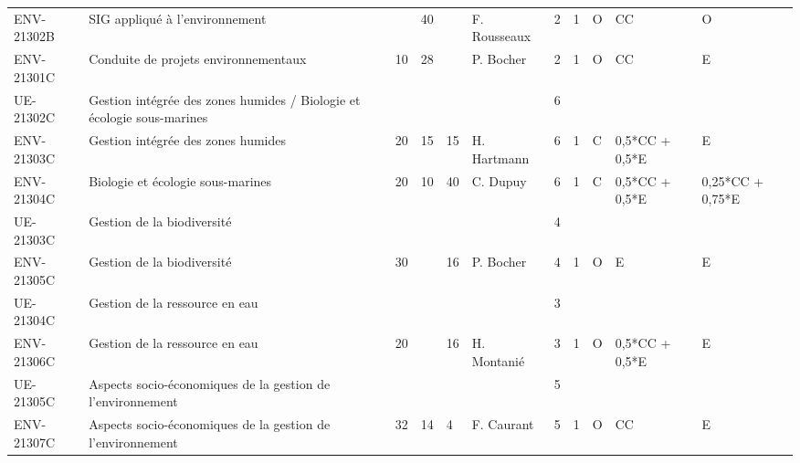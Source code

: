 \documentclass[a4paper,11pt]{article}
\begin{document}
{{\begin{tabular}{lllllllllll}
ENV-21302B    & SIG appliqué à l'environnement                                                 &    & 40 &    & F. Rousseaux    & 2    & 1    & O           & CC               & O                \\
ENV-21301C    & Conduite de projets environnementaux                                           & 10 & 28 &    & P. Bocher       & 2    & 1    & O           & CC               & E                \\
\rowcolor[HTML]{C0C0C0} 
UE-21302C     & Gestion intégrée des zones humides / Biologie et écologie sous-marines         &    &    &    &                 & 6    &      &             &                  &                  \\
ENV-21303C    & Gestion intégrée des zones humides                                             & 20 & 15 & 15 & H. Hartmann     & 6    & 1    & C           & 0,5*CC + 0,5*E   & E                \\
ENV-21304C    & Biologie et écologie sous-marines                                              & 20 & 10 & 40 & C. Dupuy        & 6    & 1    & C           & 0,5*CC + 0,5*E   & 0,25*CC + 0,75*E \\
\rowcolor[HTML]{C0C0C0} 
UE-21303C     & Gestion de la biodiversité                                                     &    &    &    &                 & 4    &      &             &                  &                  \\
ENV-21305C    & Gestion de la biodiversité                                                     & 30 &    & 16 & P. Bocher       & 4    & 1    & O           & E                & E                \\
\rowcolor[HTML]{C0C0C0} 
UE-21304C     & Gestion de la ressource en eau                                                 &    &    &    &                 & 3    &      &             &                  &                  \\
ENV-21306C    & Gestion de la ressource en eau                                                 & 20 &    & 16 & H. Montanié     & 3    & 1    & O           & 0,5*CC + 0,5*E   & E                \\
\rowcolor[HTML]{C0C0C0} 
UE-21305C     & Aspects socio-économiques de la gestion de l'environnement                     &    &    &    &                 & 5    &      &             &                  &                  \\
ENV-21307C    & Aspects socio-économiques de la gestion de l'environnement                     & 32 & 14 & 4  & F. Caurant      & 5    & 1    & O           & CC               & E                \\

\end{tabular}}}
\end{document}
